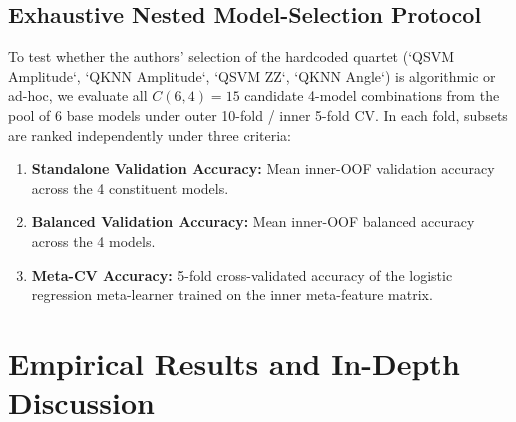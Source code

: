 \documentclass[journal,twocolumn]{IEEEtran}
\begin{document}
\subsection{Exhaustive Nested Model-Selection Protocol}
To test whether the authors' selection of the hardcoded quartet (`QSVM Amplitude`, `QKNN Amplitude`, `QSVM ZZ`, `QKNN Angle`) is algorithmic or ad-hoc, we evaluate all $C(6, 4) = 15$ candidate 4-model combinations from the pool of 6 base models under outer 10-fold / inner 5-fold CV. In each fold, subsets are ranked independently under three criteria:
\begin{enumerate}
    \item \textbf{Standalone Validation Accuracy:} Mean inner-OOF validation accuracy across the 4 constituent models.
    \item \textbf{Balanced Validation Accuracy:} Mean inner-OOF balanced accuracy across the 4 models.
    \item \textbf{Meta-CV Accuracy:} 5-fold cross-validated accuracy of the logistic regression meta-learner trained on the inner meta-feature matrix.
\end{enumerate}

\section{Empirical Results and In-Depth Discussion}
\end{document}
